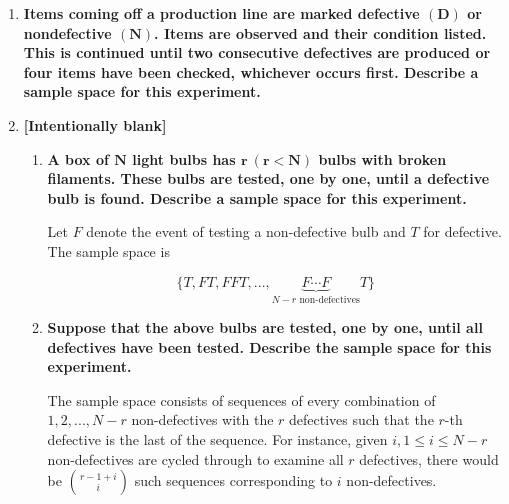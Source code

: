 \documentclass[10pt, oneside]{article}
\begin{document}
\begin{enumerate}[label=1.\arabic*]
\begin{enumerate}
	
	\end{enumerate}

\item  \begin{tcolorbox}[
  colback=Cerulean!5!white,
  colframe=Cerulean!75!black]
\textbf{Items coming off a production line are marked defective $\bm{(D)}$ or nondefective $\bm{(N)}$. Items are observed and their condition listed. This is continued until two consecutive defectives are produced or four items have been checked, whichever occurs first. Describe a sample space for this experiment.}
\end{tcolorbox}


\item  \begin{tcolorbox}[
  colback=Cerulean!5!white,
  colframe=Cerulean!75!black]
\textbf{[Intentionally blank]}
\end{tcolorbox}

	\begin{enumerate}
	\item  \begin{tcolorbox}[
	  colback=Cerulean!5!white,
	  colframe=Cerulean!75!black]
	\textbf{A box of $\bm{N}$ light bulbs has $\bm{r \ (r < N)}$ bulbs with broken filaments. These bulbs are tested, one by one, until a defective bulb is found. Describe a sample space for this experiment.}
	\end{tcolorbox}
	
	Let $F$ denote the event of testing a non-defective bulb and $T$ for defective. The sample space is
	
	\[ \boxed{ \{ T, FT, FFT, ..., \underbrace{F\cdots F}_{N-r \text{ non-defectives}}T \} } \]
	
	\item  \begin{tcolorbox}[
	  colback=Cerulean!5!white,
	  colframe=Cerulean!75!black]
	\textbf{Suppose that the above bulbs are tested, one by one, until all defectives have been tested. Describe the sample space for this experiment.}
	\end{tcolorbox}
	
	The sample space consists of sequences of every combination of $1, 2, ..., N-r$ non-defectives with the $r$ defectives such that the $r$-th defective is the last of the sequence. For instance, given $i, 1 \leq i \leq N-r$ non-defectives are cycled through to examine all $r$ defectives, there would be $\binom{r-1+i}{i}$ such sequences corresponding to $i$ non-defectives.
	

\end{enumerate}
\end{enumerate}
\end{document}
